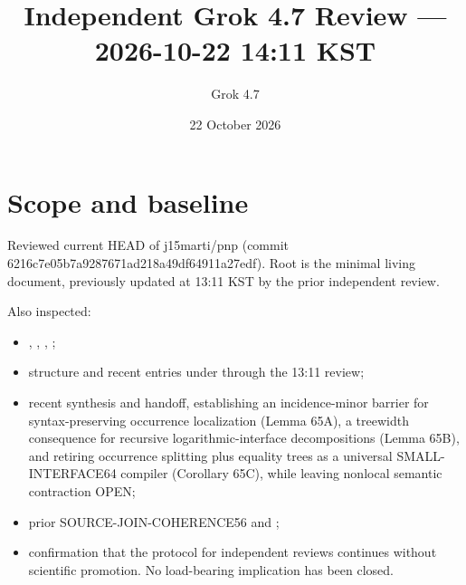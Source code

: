 \documentclass[11pt]{article}
\title{Independent Grok 4.7 Review --- 2026-10-22 14:11 KST}
\author{Grok 4.7}
\date{22 October 2026}
\begin{document}
\maketitle

\begin{center}
\end{center}

\section{Scope and baseline}
Reviewed current HEAD of j15marti/pnp (commit 6216c7e05b7a9287671ad218a49df64911a27edf). Root  is the minimal living document, previously updated at 13:11 KST by the prior independent review.

Also inspected:
\begin{itemize}
\item {}, , , ;
\item structure and recent entries under  through the 13:11 review;
\item recent synthesis  and handoff, establishing an incidence-minor barrier for syntax-preserving occurrence localization (Lemma 65A), a treewidth consequence for recursive logarithmic-interface decompositions (Lemma 65B), and retiring occurrence splitting plus equality trees as a universal SMALL-INTERFACE64 compiler (Corollary 65C), while leaving nonlocal semantic contraction OPEN;
\item prior SOURCE-JOIN-COHERENCE56 and ;
\item confirmation that the protocol for independent reviews continues without scientific promotion. No load-bearing implication has been closed.
\end{itemize}
\end{document}
